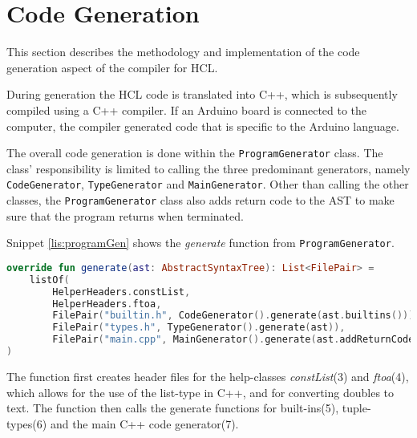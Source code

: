 \section{Code Generation}
This section describes the methodology and implementation of the code generation aspect of the compiler for HCL. 

During generation the HCL code is translated into C++, which is subsequently compiled using a C++ compiler.
If an Arduino board is connected to the computer, the compiler generated code that is specific to the Arduino language. 

The overall code generation is done within the \texttt{ProgramGenerator} class.
The class' responsibility is limited to calling the three predominant generators, namely \texttt{CodeGenerator}, \texttt{TypeGenerator} and \texttt{MainGenerator}.
Other than calling the other classes, the \texttt{ProgramGenerator} class also adds return code to the AST to make sure that the program returns when terminated. 

Snippet \ref{lis:programGen} shows the \textit{generate} function from \texttt{ProgramGenerator}.

\begin{lstlisting}[language=Kotlin,label=lis:programGen,caption=The implementation of \textit{generate} in \texttt{ProgramGenerator}.]
override fun generate(ast: AbstractSyntaxTree): List<FilePair> = 
	listOf(
		HelperHeaders.constList,
		HelperHeaders.ftoa,
		FilePair("builtin.h", CodeGenerator().generate(ast.builtins())),
		FilePair("types.h", TypeGenerator().generate(ast)),
		FilePair("main.cpp", MainGenerator().generate(ast.addReturnCode().notBuiltins()))
)
\end{lstlisting}

The function first creates header files for the help-classes \textit{constList}(3) and \textit{ftoa}(4), which allows for the use of the list-type in C++, and for converting doubles to text. 
The function then calls the generate functions for built-ins(5), tuple-types(6) and the main C++ code generator(7).  

